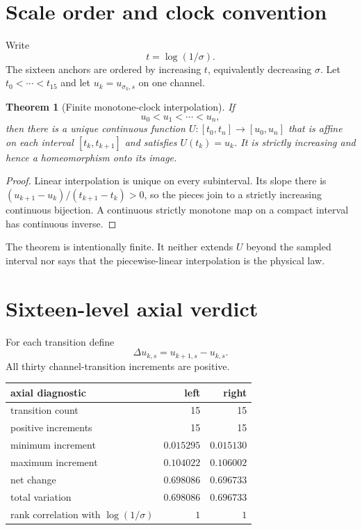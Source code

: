 \documentclass[12pt]{article}
\newtheorem{theorem}{Theorem}[section]\newtheorem{proposition}[theorem]{Proposition}
\theoremstyle{remark}\newtheorem{remark}[theorem]{Remark}
\begin{document}
\section{Scale order and clock convention}

Write
\begin{equation}\label{eq:time}
 t=\log(1/\sigma).
\end{equation}
The sixteen anchors are ordered by increasing $t$, equivalently decreasing
$\sigma$.  Let $t_0<\cdots<t_{15}$ and let $u_k=u_{\sigma_k,s}$ on one
channel.

\begin{theorem}[Finite monotone-clock interpolation]\label{thm:clock}
If
\begin{equation}\label{eq:strict}
 u_0<u_1<\cdots<u_n,
\end{equation}
then there is a unique continuous function $U:[t_0,t_n]\to[u_0,u_n]$ that
is affine on each interval $[t_k,t_{k+1}]$ and satisfies $U(t_k)=u_k$.
It is strictly increasing and hence a homeomorphism onto its image.
\end{theorem}
\begin{proof}
Linear interpolation is unique on every subinterval.  Its slope there is
$(u_{k+1}-u_k)/(t_{k+1}-t_k)>0$, so the pieces join to a strictly increasing
continuous bijection.  A continuous strictly monotone map on a compact
interval has continuous inverse.
\end{proof}

The theorem is intentionally finite.  It neither extends $U$ beyond the
sampled interval nor says that the piecewise-linear interpolation is the
physical law.

\section{Sixteen-level axial verdict}

For each transition define
\begin{equation}
 \Delta u_{k,s}=u_{k+1,s}-u_{k,s}.
\end{equation}
All thirty channel-transition increments are positive.

\begin{center}
\begin{tabular}{lrr}
\toprule
axial diagnostic & left & right\\
\midrule
transition count & 15 & 15\\
positive increments & 15 & 15\\
minimum increment & $0.015295$ & $0.015130$\\
maximum increment & $0.104022$ & $0.106002$\\
net change & $0.698086$ & $0.696733$\\
total variation & $0.698086$ & $0.696733$\\
rank correlation with $\log(1/\sigma)$ & $1$ & $1$\\
\bottomrule
\end{tabular}
\end{center}
\end{document}
